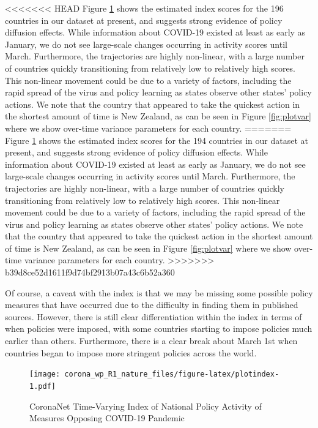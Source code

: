 \documentclass[]{article}
\begin{document}
<<<<<<< HEAD
Figure \ref{fig:plotindex} shows the estimated index scores for the 196 countries in our dataset at present, and suggests strong evidence of policy diffusion effects. While information about COVID-19 existed at least as early as January, we do not see large-scale changes occurring in activity scores until March. Furthermore, the trajectories are highly non-linear, with a large number of countries quickly transitioning from relatively low to relatively high scores. This non-linear movement could be due to a variety of factors, including the rapid spread of the virus and policy learning as states observe other states' policy actions. We note that the country that appeared to take the quickest action in the shortest amount of time is New Zealand, as can be seen in Figure \ref{fig:plotvar} where we show over-time variance parameters for each country.
=======
Figure \ref{fig:plotindex} shows the estimated index scores for the 194 countries in our dataset at present, and suggests strong evidence of policy diffusion effects. While information about COVID-19 existed at least as early as January, we do not see large-scale changes occurring in activity scores until March. Furthermore, the trajectories are highly non-linear, with a large number of countries quickly transitioning from relatively low to relatively high scores. This non-linear movement could be due to a variety of factors, including the rapid spread of the virus and policy learning as states observe other states' policy actions. We note that the country that appeared to take the quickest action in the shortest amount of time is New Zealand, as can be seen in Figure \ref{fig:plotvar} where we show over-time variance parameters for each country.
>>>>>>> b39d8ce52d1611f9d74bf2913b07a43c6b52a360

Of course, a caveat with the index is that we may be missing some possible policy measures that have occurred due to the difficulty in finding them in published sources. However, there is still clear differentiation within the index in terms of when policies were imposed, with some countries starting to impose policies much earlier than others. Furthermore, there is a clear break about March 1st when countries began to impose more stringent policies across the world.

\begin{figure}
\centering
\texttt{[image: corona\_wp\_R1\_nature\_files/figure-latex/plotindex-1.pdf]}
\caption{\label{fig:plotindex}CoronaNet Time-Varying Index of National Policy Activity of Measures Opposing COVID-19 Pandemic}
\end{figure}
\end{document}
